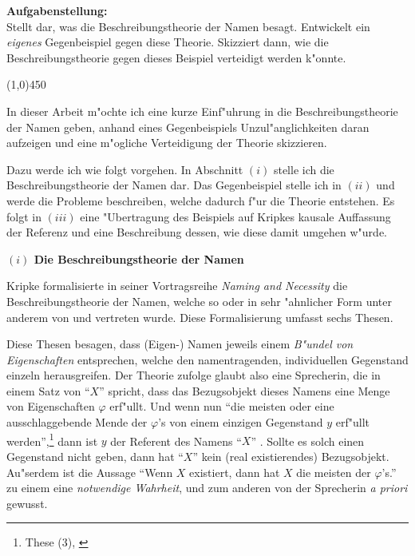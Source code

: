 \documentclass[a4paper, emulatestandardclasses, 12pt]{scrartcl}
\begin{document}
\begin{onehalfspace} 

\noindent\textbf{Aufgabenstellung:}\\
Stellt dar, was die Beschreibungstheorie der Namen besagt. Entwickelt ein \emph{eigenes} Gegenbeispiel gegen diese Theorie. Skizziert dann, wie die Beschreibungstheorie gegen dieses Beispiel verteidigt werden k"onnte.
\begin{center}
\vspace{-9pt}\line(1,0){450}
\end{center}

\vspace{5mm}
\noindent In dieser Arbeit m"ochte ich eine kurze Einf"uhrung in die Beschreibungstheorie der Namen geben, anhand eines Gegenbeispiels Unzul"anglichkeiten daran aufzeigen und eine m"ogliche Verteidigung der Theorie skizzieren.  

Dazu werde ich wie folgt vorgehen. In Abschnitt $(i)$ stelle ich die Beschreibungstheorie der Namen dar. Das Gegenbeispiel stelle ich in $(ii)$ und werde die Probleme beschreiben, welche dadurch f"ur die Theorie entstehen. Es folgt in $(iii)$ eine "Ubertragung des Beispiels auf Kripkes kausale Auffassung der Referenz und eine Beschreibung dessen, wie diese damit umgehen w"urde.
\vspace{5mm}

\noindent\textbf{$(i)$ Die Beschreibungstheorie der Namen}

\noindent Kripke formalisierte in seiner Vortragsreihe \emph{Naming and Necessity} \citep{kripke1972naming}  die Beschreibungstheorie der Namen, welche so oder in sehr "ahnlicher Form unter anderem von \citet{begriffundgegenstand} und \citet{russell1905denoting} vertreten wurde. Diese Formalisierung umfasst sechs Thesen.

Diese Thesen besagen, dass (Eigen-) Namen jeweils einem \emph{B"undel von Eigenschaften} entsprechen, welche den namentragenden, individuellen Gegenstand einzeln herausgreifen. Der Theorie zufolge glaubt also eine Sprecherin, die in einem Satz von "`$X$"' spricht, dass das Bezugsobjekt dieses Namens eine Menge von Eigenschaften $\varphi$ erf"ullt. Und wenn nun  "`die meisten oder eine ausschlaggebende Mende der $\varphi$'s von einem einzigen Gegenstand $y$ erf"ullt werden"',\footnote{These (3), \cite{begriffundgegenstand}} dann ist $y$ der Referent des Namens "`$X$"' . Sollte es solch einen Gegenstand nicht geben, dann hat "`$X$"' kein (real existierendes) Bezugsobjekt. Au"serdem ist die Aussage "`Wenn $X$ existiert, dann hat $X$ die meisten der $\varphi$'s."' zu einem eine \emph{notwendige Wahrheit}, und zum anderen von der Sprecherin \emph{a priori} gewusst.


\end{onehalfspace}
\end{document}
